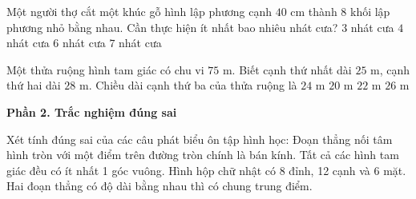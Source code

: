 \begin{ex} %
Một người thợ cắt một khúc gỗ hình lập phương cạnh $40\text{ cm}$ thành 8 khối lập phương nhỏ bằng nhau. Cần thực hiện ít nhất bao nhiêu nhát cưa?
\choice
{\True $3$ nhát cưa}
{$4$ nhát cưa}
{$6$ nhát cưa}
{$7$ nhát cưa}
\end{ex}

\begin{ex} %
Một thửa ruộng hình tam giác có chu vi $75\text{ m}$. Biết cạnh thứ nhất dài $25\text{ m}$, cạnh thứ hai dài $28\text{ m}$. Chiều dài cạnh thứ ba của thửa ruộng là
\choice
{$24\text{ m}$}
{$20\text{ m}$}
{\True $22\text{ m}$}
{$26\text{ m}$}
\end{ex}

\textbf{Phần 2. Trắc nghiệm đúng sai}

\begin{ex} %
Xét tính đúng sai của các câu phát biểu ôn tập hình học:
\choiceTF
{\True Đoạn thẳng nối tâm hình tròn với một điểm trên đường tròn chính là bán kính.}
{Tất cả các hình tam giác đều có ít nhất 1 góc vuông.}
{\True Hình hộp chữ nhật có 8 đỉnh, 12 cạnh và 6 mặt.}
{Hai đoạn thẳng có độ dài bằng nhau thì có chung trung điểm.}
\end{ex}

